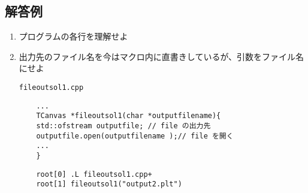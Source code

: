   \subsection{解答例}
  \begin{enumerate}
   \item プログラムの各行を理解せよ
	 
   \item 出力先のファイル名を今はマクロ内に直書きしているが、引数をファイル名にせよ
	 
	  \begin{itembox}{\texttt{fileoutsol1.cpp}}
\begin{verbatim}
	...
	TCanvas *fileoutsol1(char *outputfilename){
	std::ofstream outputfile; // file の出力先
	outputfile.open(outputfilename );// file を開く
	...
	}
\end{verbatim}
	  \end{itembox}

\begin{verbatim}
	root[0] .L fileoutsol1.cpp+
	root[1] fileoutsol1("output2.plt") 
\end{verbatim} 

  \end{enumerate}